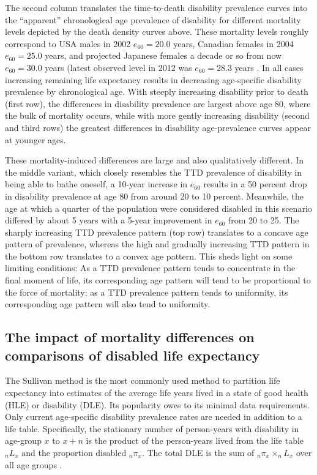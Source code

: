 \documentclass[12pt,oneside,letterpaper,doublespacing]{article}  %
\begin{document}
The second column translates the time-to-death disability prevalence curves into
the ``apparent'' chronological age prevalence of disability for different
mortality levels depicted by the death density curves above. These mortality
levels roughly correspond to USA males in 2002 $e_{60} = 20.0$ years, Canadian
females in 2004 $e_{60} = 25.0$ years, and projected Japanese females a decade
or so from now $e_{60} = 30.0$ years (latest observed level in 2012 was $e_{60}
= 28.3$ years \citep{HMD2018}. In all cases increasing remaining life
expectancy results in decreasing age-specific disability prevalence by
chronological age. With steeply increasing disability prior to death (first
row), the differences in disability prevalence are largest above age 80, where
the bulk of mortality occurs, while with more gently increasing disability
(second and third rows) the greatest differences in disability age-prevalence
curves appear at younger ages.

These mortality-induced differences are large and also qualitatively different. In the middle variant, which closely resembles the TTD prevalence of disability in being able to bathe oneself, a 10-year increase in $e_{60}$ results in a 50 percent drop in disability prevalence at age 80 from around 20 to 10 percent. Meanwhile, the age at which a quarter of the population were considered disabled in this scenario differed by about 5 years with a 5-year improvement in $e_{60}$ from 20 to 25. The sharply increasing TTD prevalence pattern (top row) translates to a concave age pattern of prevalence, whereas the high and gradually increasing TTD pattern in the bottom row translates to a convex age pattern. This sheds light on some limiting conditions: As a TTD prevalence pattern tends to concentrate in the final moment of life, its corresponding age pattern will tend to be proportional to the force of mortality; as a TTD prevalence pattern tends to uniformity, its corresponding age pattern will also tend to uniformity.

\FloatBarrier
\subsection{The impact of mortality differences on comparisons of disabled life expectancy}
\label{sec:bounds}
The Sullivan method is the most commonly used method to partition life
expectancy into estimates of the average life years lived in a state of good
health (HLE) or disability (DLE). Its popularity owes to its minimal data
requirements. Only current age-specific disability prevalence rates are needed
in addition to a life table. Specifically, the stationary
number of person-years with disability in
age-group $x$ to $x+n$ is the product of the person-years lived from the life
table $_{n}L _{x}$ and the proportion disabled $_{n}\pi _{x}$. The total DLE is
the sum of  $_{n}\pi _{x} \times _{n}L _{x}$ over all age groups
\citep{Sullivan1970}.
\end{document}
